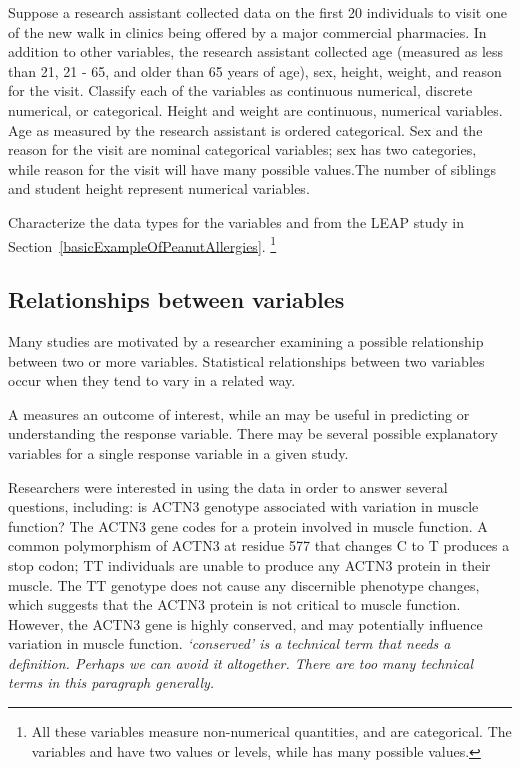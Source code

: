 \begin{doublespace}
\begin{example}{Suppose a research assistant collected data on the first 20 individuals to visit one of the new walk in clinics being offered by a major commercial pharmacies.  In addition to other variables, the research assistant collected age (measured as less than 21, 21 - 65, and older than 65 years of age), sex, height, weight, and reason for the visit.  Classify each of the variables as continuous numerical, discrete numerical, or categorical.}
Height and weight are continuous, numerical variables. Age as  measured by the research assistant is ordered categorical. Sex and the reason for the visit are nominal categorical variables; sex has two categories, while reason for the visit will have many possible values.The number of siblings and student height represent numerical variables. 
\end{example}


\begin{exercise} 
Characterize the data types for the variables   and  from the LEAP study in Section~\ref{basicExampleOfPeanutAllergies}.  \footnote{All these variables measure non-numerical quantities, and are categorical. The variables    and  have two values or levels, while  has many possible values.}
\end{exercise}

\subsection{Relationships between variables}
\label{variableRelations}

Many studies are motivated by a researcher examining a possible relationship between two or more variables. Statistical relationships between two variables occur when they tend to vary in a related way.

A  measures an outcome of interest, while an  may be useful in predicting or understanding the response variable. There may be several possible explanatory variables for a single response variable in a given study.

Researchers were interested in using the  data in order to answer several questions, including: is ACTN3 genotype associated with variation in muscle function? The ACTN3 gene codes for a protein involved in muscle function. A common polymorphism of ACTN3 at residue 577 that changes C to T produces a stop codon; TT individuals are unable to produce any ACTN3 protein in their muscle. The TT genotype does not cause any discernible phenotype changes, which suggests that the ACTN3 protein is not critical to muscle function. However, the ACTN3 gene is highly conserved, and may potentially influence variation in muscle function.  \textit{`conserved' is a technical term that needs a definition.  Perhaps we can avoid it altogether.  There are too many technical terms in this paragraph generally.}


\end{doublespace}

